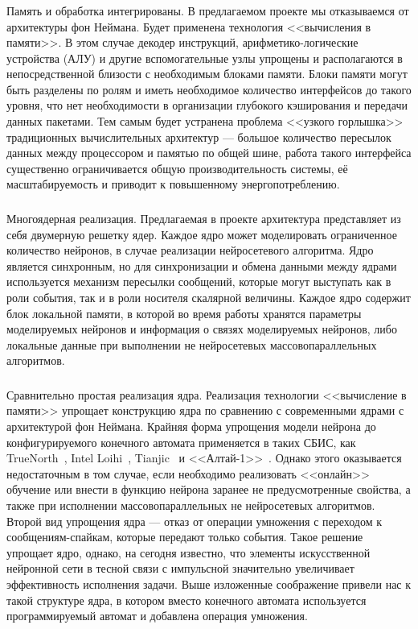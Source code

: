 \subsubsection{}
Память и обработка интегрированы. В предлагаемом проекте мы отказываемся от
архитектуры фон Неймана. Будет применена технология <<вычисления в памяти>>.
В этом случае декодер инструкций, арифметико-логические устройства (АЛУ) и
другие вспомогательные узлы упрощены и располагаются в непосредственной
близости с необходимым блоками памяти. Блоки памяти могут быть разделены по ролям и
иметь необходимое количество интерфейсов до такого уровня, что нет необходимости
в организации глубокого кэширования и передачи данных пакетами. Тем самым
будет устранена проблема <<узкого горлышка>> традиционных вычислительных
архитектур --- большое количество пересылок данных между процессором и памятью
по общей шине, работа такого интерфейса существенно ограничивается общую
производительность системы, её масштабируемость и приводит к повышенному
энергопотреблению.

\subsubsection{}
Многоядерная реализация. Предлагаемая в проекте архитектура представляет из
себя двумерную решетку ядер. Каждое ядро может моделировать ограниченное количество
нейронов, в случае реализации нейросетевого алгоритма. Ядро является синхронным,
но для синхронизации и обмена данными между ядрами используется механизм
пересылки сообщений, которые могут выступать как в роли события, так и
в роли носителя скалярной величины.
Каждое ядро содержит блок локальной памяти, в которой во время работы хранятся
параметры моделируемых нейронов и информация о связях моделируемых нейронов, либо
локальные данные при выполнении не нейросетевых массовопараллельных алгоритмов.

\subsubsection{}
Сравнительно простая реализация ядра. Реализация технологии
<<вычисление в памяти>> упрощает конструкцию ядра по сравнению с современными
ядрами с архитектурой фон Неймана. Крайняя форма упрощения модели нейрона
до конфигурируемого конечного автомата применяется в таких СБИС, как
TrueNorth~\cite{nasic:truenorth},
Intel Loihi~\cite{nasic:loihi},
Tianjic~\cite{nasic:tianjic}
и <<Алтай-1>>~\cite{nasic:altai1}. Однако этого оказывается недостаточным в том
случае, если необходимо реализовать <<онлайн>> обучение или внести в функцию
нейрона заранее не предусмотренные свойства, а также при исполнении
массовопараллельных не нейросетевых алгоритмов. Второй вид упрощения
ядра --- отказ от операции умножения с переходом
к сообщениям-спайкам, которые передают только события. Такое решение
упрощает ядро, однако, на сегодня известно, что элементы искусственной
нейронной сети в тесной связи с импульсной значительно увеличивает
эффективность исполнения задачи. Выше изложенные соображение привели нас к
такой структуре ядра, в котором вместо конечного
автомата используется программируемый автомат и добавлена операция умножения.

